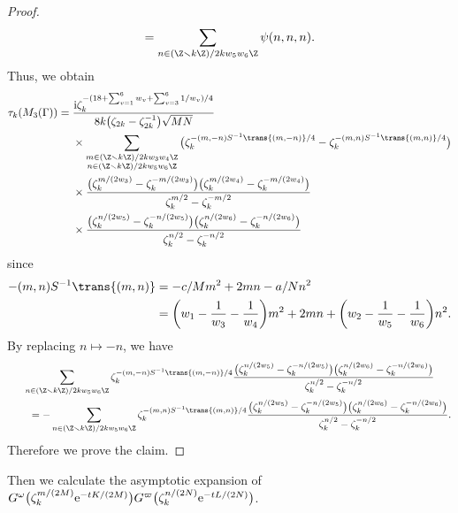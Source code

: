 \begin{proof}
\begin{align*}
		= 	\sum_{n \in (\Z \smallsetminus k\Z) / 2k w_5 w_6\Z} \psi (n, n, n).
	\end{align*}
	Thus, we obtain
	\begin{align*}
		\tau_k(M_3(\Gamma))		= {}&\frac{{\rm i} \zeta_{k}^{-(18 + \sum_{v=1}^{6}w_{v} + \sum_{v=3}^{6} 1/w_{v})/4}}{8k \big(\zeta_{2k}-\zeta_{2k}^{-1}\big) \sqrt{MN}}
\\
&\times\sum_{\substack{m \in (\Z \smallsetminus k\Z) / 2kw_3w_4\Z \\ n \in (\Z \smallsetminus k\Z) / 2kw_5w_6\Z}}
\big( \zeta_k^{-(m, -n) S^{-1} \trans{(m, -n)}/4} - \zeta_k^{-(m, n) S^{-1} \trans{(m, n)}/4} \big)
\\
&\times\frac{\big( \zeta_k^{m/(2w_3)} - \zeta_k^{-m/(2w_3)} \big)\big( \zeta_k^{m/(2w_4)} - \zeta_k^{-m/(2w_4)} \big)}{ \zeta_k^{m/2} - \zeta_k^{-m/2}}
\\
&\times\frac{\big( \zeta_k^{n/(2w_5)} - \zeta_k^{-n/(2w_5)} \big)\big( \zeta_k^{n/(2w_6)} - \zeta_k^{-n/(2w_6)} \big)}{\zeta_k^{n/2} - \zeta_k^{-n/2}}
	\end{align*}
	since
	\begin{align*}
		-(m, n) S^{-1} \trans{(m, n)}
		&= -c/M m^{2} + 2mn - a/Nn^{2}
\\
		&= \bigg( w_1 - \frac{1}{w_3} - \frac{1}{w_4} \bigg) m^2 + 2mn + \bigg( w_2 - \frac{1}{w_5} - \frac{1}{w_6} \bigg) n^2.
	\end{align*}
	By replacing $ n \mapsto -n $, we have
	\begin{gather*}
		\sum_{ n \in (\Z \smallsetminus k\Z) / 2kw_5w_6\Z }
		\zeta_k^{-(m, -n) S^{-1} \trans{(m, -n)}/4}
		\frac{\big( \zeta_k^{n/(2w_5)} - \zeta_k^{-n/(2w_5)} \big)\big( \zeta_k^{n/(2w_6)} - \zeta_k^{-n/(2w_6)} \big)}
		{\zeta_k^{n/2} - \zeta_k^{-n/2}}
\\ \qquad
		{}= -\sum_{ n \in (\Z \smallsetminus k\Z) / 2kw_5w_6\Z }
		\zeta_k^{-(m, n) S^{-1} \trans{(m, n)}/4}
		\frac{\big( \zeta_k^{n/(2w_5)} - \zeta_k^{-n/(2w_5)} \big)\big( \zeta_k^{n/(2w_6)} - \zeta_k^{-n/(2w_6)} \big)}
		{\zeta_k^{n/2} - \zeta_k^{-n/2}}.
	\end{gather*}
	Therefore we prove the claim.
\end{proof}

Then we calculate the asymptotic expansion of $G^\omega\big(\zeta_k^{m/(2M)} {\rm e}^{-tK/(2M)}\big) G^\varpi\big(\zeta_k^{n/(2N)} {\rm e}^{-tL/(2N)}\big)$.

